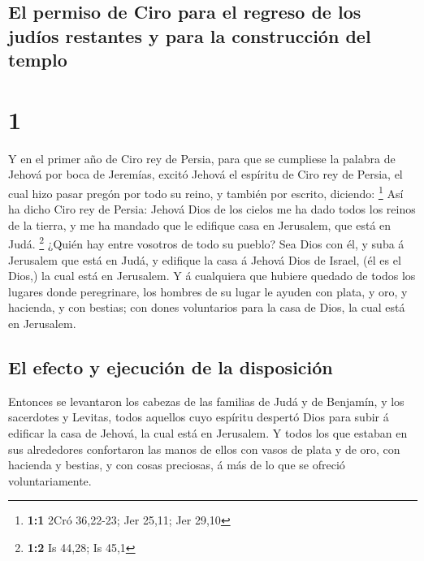 \hypertarget{el-permiso-de-ciro-para-el-regreso-de-los-juduxedos-restantes-y-para-la-construcciuxf3n-del-templo}{%
\subsection{El permiso de Ciro para el regreso de los judíos restantes y
para la construcción del
templo}\label{el-permiso-de-ciro-para-el-regreso-de-los-juduxedos-restantes-y-para-la-construcciuxf3n-del-templo}}

\hypertarget{section}{%
\section{1}\label{section}}

 Y en el primer año de Ciro rey de Persia, para que se
cumpliese la palabra de Jehová por boca de Jeremías, excitó Jehová el
espíritu de Ciro rey de Persia, el cual hizo pasar pregón por todo su
reino, y también por escrito, diciendo: \footnote{\textbf{1:1} 2Cró
  36,22-23; Jer 25,11; Jer 29,10}  Así ha dicho Ciro rey
de Persia: Jehová Dios de los cielos me ha dado todos los reinos de la
tierra, y me ha mandado que le edifique casa en Jerusalem, que está en
Judá. \footnote{\textbf{1:2} Is 44,28; Is 45,1}  ¿Quién
hay entre vosotros de todo su pueblo? Sea Dios con él, y suba á
Jerusalem que está en Judá, y edifique la casa á Jehová Dios de Israel,
(él es el Dios,) la cual está en Jerusalem.  Y á
cualquiera que hubiere quedado de todos los lugares donde peregrinare,
los hombres de su lugar le ayuden con plata, y oro, y hacienda, y con
bestias; con dones voluntarios para la casa de Dios, la cual está en
Jerusalem.

\hypertarget{el-efecto-y-ejecuciuxf3n-de-la-disposiciuxf3n}{%
\subsection{El efecto y ejecución de la
disposición}\label{el-efecto-y-ejecuciuxf3n-de-la-disposiciuxf3n}}

 Entonces se levantaron los cabezas de las familias de
Judá y de Benjamín, y los sacerdotes y Levitas, todos aquellos cuyo
espíritu despertó Dios para subir á edificar la casa de Jehová, la cual
está en Jerusalem.  Y todos los que estaban en sus
alrededores confortaron las manos de ellos con vasos de plata y de oro,
con hacienda y bestias, y con cosas preciosas, á más de lo que se
ofreció voluntariamente.

